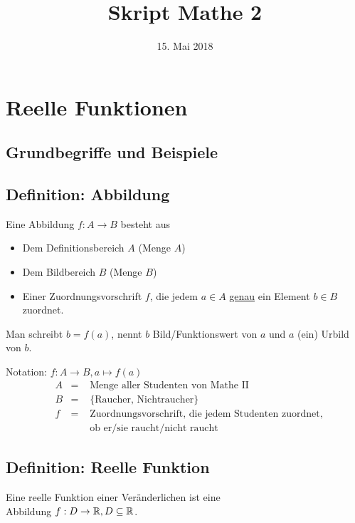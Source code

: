\documentclass[10pt, a4paper, fleqn]{article}
\begin{document}
    \title{Skript Mathe 2}
    \date{15. Mai 2018} %
    \maketitle
\fi
    \section{Reelle Funktionen}
    \subsection*{Grundbegriffe und Beispiele}
    \subsection{Definition: Abbildung}

    Eine Abbildung $f: A \to B$ besteht aus
    \begin{itemize}
        \item Dem Definitionsbereich $A$ (Menge $A$)
        \item Dem Bildbereich $B$ (Menge $B$)
        \item Einer Zuordnungsvorschrift $f$, die jedem $a \in A$
        \underline{genau} ein Element $b \in B$ zuordnet.
    \end{itemize}
    Man schreibt $b = f(a)$, nennt $b$ Bild/Funktionswert von $a$ und $a$
    (ein) Urbild von $b$.

    Notation: $f: A \to B, a \mapsto f(a)$
    \[\begin{aligned}
        &A&=&\text{ Menge aller Studenten von Mathe II} \\
        &B&=&\text{ \{Raucher, Nichtraucher\}} \\
        &f&=&\text{ Zuordnungsvorschrift, die jedem Studenten zuordnet,} \\
        &&&\text{ ob er/sie raucht/nicht raucht}
    \end{aligned}\]
    
    \subsection{Definition: Reelle Funktion}
    Eine reelle Funktion einer Veränderlichen ist eine \\ 
    Abbildung $f: D \to \mathbb{R}, D \subseteq \mathbb{R}$.
\end{document}
